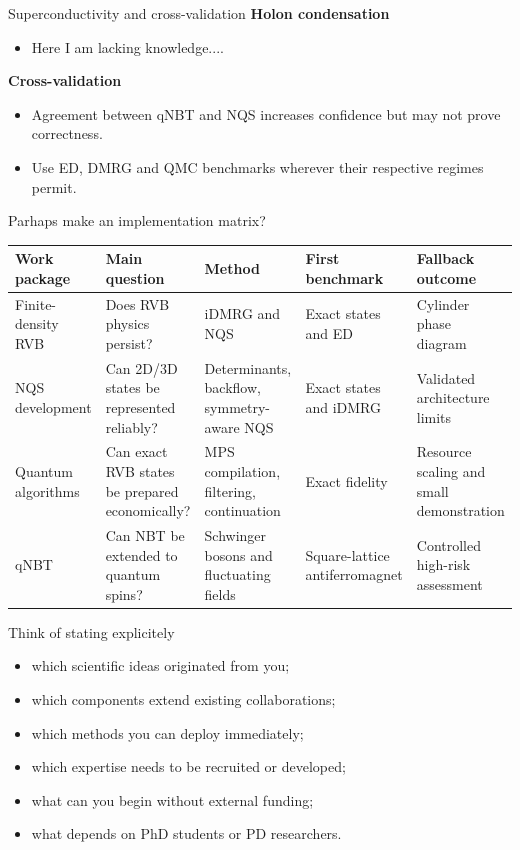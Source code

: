 \documentclass[aspectratio=169,11pt]{beamer}
\begin{document}
\begin{frame}{Superconductivity and cross-validation}
\textbf{Holon condensation}
\begin{itemize}
  \item Here I am lacking knowledge....
\end{itemize}

\textbf{Cross-validation}
\begin{itemize}
  \item Agreement between qNBT and NQS increases confidence but may not prove correctness.
  \item Use ED, DMRG and QMC benchmarks wherever their respective regimes permit.
\end{itemize}
\end{frame}

\begin{frame}{Parhaps make an implementation matrix?}
\scriptsize
\setlength{\tabcolsep}{3pt}
\begin{tabular}{p{2.4cm}p{2.8cm}p{2.5cm}p{2.7cm}p{2.8cm}}
\toprule
\textbf{Work package} & \textbf{Main question} & \textbf{Method} & \textbf{First benchmark} & \textbf{Fallback outcome} \\
\midrule
Finite-density RVB & Does RVB physics persist? & iDMRG and NQS & Exact states and ED & Cylinder phase diagram \\
\addlinespace
NQS development & Can 2D/3D states be represented reliably? & Determinants, backflow, symmetry-aware NQS & Exact states and iDMRG & Validated architecture limits \\
\addlinespace
Quantum algorithms & Can exact RVB states be prepared economically? & MPS compilation, filtering, continuation & Exact fidelity & Resource scaling and small demonstration \\
\addlinespace
qNBT & Can NBT be extended to quantum spins? & Schwinger bosons and fluctuating fields & Square-lattice antiferromagnet & Controlled high-risk assessment \\
\bottomrule
\end{tabular}
\end{frame}

\begin{frame}{Think of stating explicitely}

\begin{itemize}
  \item which scientific ideas originated from you;
  \item which components extend existing collaborations;
  \item which methods you can deploy immediately;
  \item which expertise needs to be recruited or developed;
  \item what can you begin without external funding;
  \item what depends on PhD students or PD researchers.
\end{itemize}

\end{frame}
\end{document}

